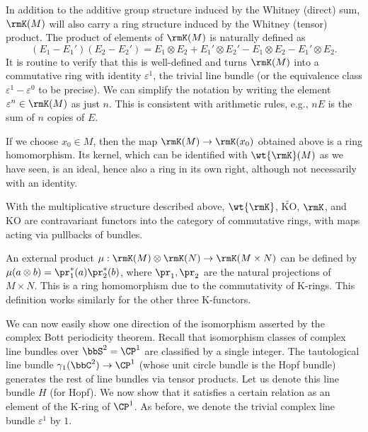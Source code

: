 In addition to the additive group structure induced by the Whitney (direct) sum, $\rmK(M)$ will also carry a ring structure induced by the Whitney (tensor) product. The product of elements of $\rmK(M)$ is naturally defined as 
\[(E_1-E_1')(E_2-E_2')=E_1\otimes E_2+ E_1'\otimes E_2'-E_1\otimes E_2-E_1'\otimes E_2.\]
It is routine to verify that this is well-defined and turns $\rmK(M)$ into a commutative ring with identity $\varepsilon^1$, the trivial line bundle (or the equivalence class $\varepsilon^1-\varepsilon^0$ to be precise). We can simplify the notation by writing the element $\varepsilon^n\in \rmK(M)$ as just $n$. This is consistent with arithmetic rules, e.g., $nE$ is the sum of $n$ copies of $E$.

If we choose $x_0\in M$, then the map $\rmK(M)\to \rmK(x_0)$ obtained above is a ring homomorphism. Its kernel, which can be identified with $\wt{\rmK}(M)$ as we have seen, is an ideal, hence also a ring in its own right, although not necessarily with an identity.

\begin{defn}[K-rings]
    With the multiplicative structure described above, $\wt{\rmK}$, $\widetilde{\mathrm{KO}}$, $\rmK$, and $\mathrm{KO}$ are contravariant functors into the category of commutative rings, with maps acting via pullbacks of bundles.
\end{defn}

\begin{defn}
    An external product $\mu:\rmK(M)\otimes \rmK(N)\to \rmK(M\times N)$ can be defined by $\mu(a\otimes b)=\pr_1^\ast(a)\pr_2^\ast(b)$, where $\pr_1,\pr_2$ are the natural projections of $M\times N$. This is a ring homomorphism due to the commutativity of K-rings. This definition works similarly for the other three K-functors.
\end{defn}


We can now easily show one direction of the isomorphism asserted by the complex Bott periodicity theorem. Recall that isomorphism classes of complex line bundles over $\bbS^2=\CP^1$ are classified by a single integer. The tautological line bundle $\gamma_1(\bbC^2)\to \CP^1$ (whose unit circle bundle is the Hopf bundle) generates the rest of line bundles via tensor products. Let us denote this line bundle $H$ (for Hopf). We now show that it satisfies a certain relation as an element of the K-ring of $\CP^1$. As before, we denote the trivial complex line bundle $\varepsilon^1$ by $1$.

